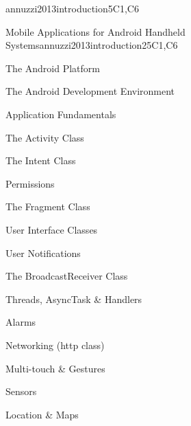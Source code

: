 \begin{syllabus}
\begin{unit}{\PBDMobilePlatforms}{}{annuzzi2013introduction}{5}{C1,C6}
\begin{topics}%
    \item \PBDMobilePlatformsTopicMobile
    \item \PBDMobilePlatformsTopicChallenges
    \item \PBDMobilePlatformsTopicLocation
    \item \PBDMobilePlatformsTopicPerformance
    \item \PBDMobilePlatformsTopicMobilePlatform
    \item \PBDMobilePlatformsTopicEmerging
\end{topics}
\begin{learningoutcomes}
    \item \PBDMobilePlatformsLODesignAndMobile [\Familiarity]
    \item \PBDMobilePlatformsLODiscussTheMobile [\Familiarity]
    \item \PBDMobilePlatformsLODiscussThePower [\Familiarity]
    \item \PBDMobilePlatformsLOCompareAndProgrammingPurpose [\Familiarity]
\end{learningoutcomes}
\end{unit}

\begin{unit}{Mobile Applications for Android Handheld Systems}{}{annuzzi2013introduction}{25}{C1,C6}
\begin{topics}
    \item The Android Platform
    \item The Android Development Environment
    \item Application Fundamentals
    \item The Activity Class
    \item The Intent Class
    \item Permissions
    \item The Fragment Class
    \item User Interface Classes
    \item User Notifications
    \item The BroadcastReceiver Class
    \item Threads, AsyncTask \& Handlers
    \item Alarms
    \item Networking (http class)
    \item Multi-touch \& Gestures
    \item Sensors
    \item Location \& Maps
\end{topics}


\end{unit}
\end{syllabus}

